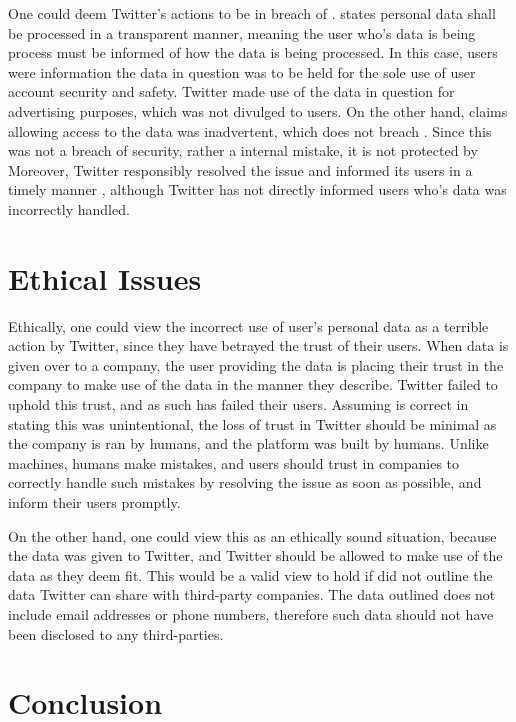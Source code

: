 \documentclass[a4paper, 11pt]{article}
\begin{document}
One could deem Twitter's actions to be in breach of \textcite{noauthor_regulation_2016}.
\textcite{noauthor_regulation_2016} states personal data shall be processed in a transparent manner, meaning the user who's data is being process must be informed of how the data is being processed.
In this case, users were information the data in question was to be held for the sole use of user account security and safety.
Twitter made use of the data in question for advertising purposes, which was not divulged to users.
On the other hand, \textcite{support_personal_2019} claims allowing access to the data was inadvertent, which does not breach \textcite{noauthor_regulation_2016}.
Since this was not a breach of security, rather a internal mistake, it is not protected by \textcite{noauthor_regulation_2016}
Moreover, Twitter responsibly resolved the issue and informed its users in a timely manner \parencite{support_twitter_2019}, although Twitter has not directly informed users who's data was incorrectly handled. 

\section{Ethical Issues}
Ethically, one could view the incorrect use of user's personal data as a terrible action by Twitter, since they have betrayed the trust of their users.
When data is given over to a company, the user providing the data is placing their trust in the company to make use of the data in the manner they describe.
Twitter failed to uphold this trust, and as such has failed their users.
Assuming \textcite{support_twitter_2019} is correct in stating this was unintentional, the loss of trust in Twitter should be minimal as the company is ran by humans, and the platform was built by humans.
Unlike machines, humans make mistakes, and users should trust in companies to correctly handle such mistakes by resolving the issue as soon as possible, and inform their users promptly.

On the other hand, one could view this as an ethically sound situation, because the data was given to Twitter, and Twitter should be allowed to make use of the data as they deem fit.
This would be a valid view to hold if \textcite{twitter_privacy_2018} did not outline the data Twitter can share with third-party companies.
The data outlined does not include email addresses or phone numbers, therefore such data should not have been disclosed to any third-parties.

\section{Conclusion}

\printbibliography
\end{document}
